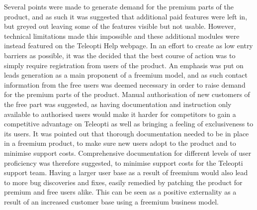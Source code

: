 Several points were made to generate demand for the premium parts of the product, and as such it was suggested that additional paid features were left in, but greyed out leaving some of the features visible but not usable. However, technical limitations made this impossible and these additional modules were instead featured on the Teleopti Help webpage. In an effort to create as low entry barriers as possible, it was the decided that the best course of action was to simply require registration from users of the product. An emphasis was put on leads generation as a main proponent of a freemium model, and as such contact information from the free users was deemed necessary in order to raise demand for the premium parts of the product. Manual authorisation of new customers of the free part was suggested, as having documentation and instruction only available to authorised users would make it harder for competitors to gain a competitive advantage on Teleopti as well as bringing a feeling of exclusiveness to its users.
\newpage
It was pointed out that thorough documentation needed to be in place in a freemium product, to make sure new users adopt to the product and to minimise support costs. Comprehensive documentation for different levels of user proficiency was therefore suggested, to minimise support costs for the Teleopti support team. Having a larger user base as a result of freemium would also lead to more bug discoveries and fixes, easily remedied by patching the product for premium and free users alike. This can be seen as a positive externality as a result of an increased customer base using a freemium business model. 


